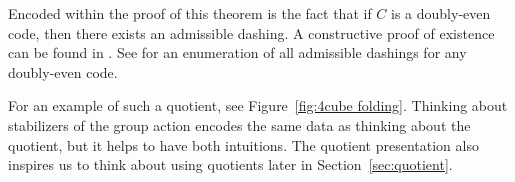 \documentclass[12pt,twoside,singlespace]{article}
\numberwithin{equation}{section}
\theoremstyle{definition}
\begin{document}
Encoded within the proof of this theorem is the fact that if $C$ is a doubly-even code, then there exists an admissible dashing. A constructive proof of existence can be found in \cite{d2l:topology}. See \cite{zhang:adinkras} for an enumeration of all admissible dashings for any doubly-even code.

For an example of such a quotient, see Figure~\ref{fig:4cube folding}. Thinking about stabilizers of the group action encodes the same data as thinking about the quotient, but it helps to have both intuitions. The quotient presentation also inspires us to think about using quotients later in Section~\ref{sec:quotient}. 







\begin{figure}[htb]
\begin{center}


\end{center}
\end{figure}
\end{document}
